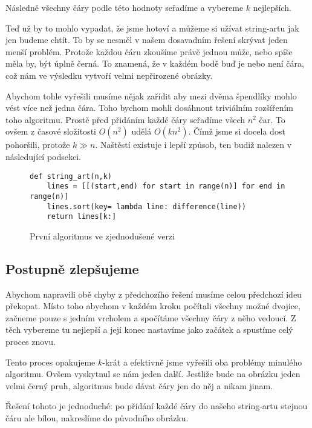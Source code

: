 \documentclass{article}
\begin{document}
Následně všechny čáry podle této hodnoty seřadíme a vybereme $k$ nejlepších.

Teď už by to mohlo vypadat, že jsme hotoví a můžeme si užívat string-artu jak
jen budeme chtít. To by se nesměl v našem dosavadním řešení skrývat jeden menší
problém. Protože každou čáru zkoušíme právě jednou může, nebo spíše měla by, být
úplně černá. To znamená, že v každém bodě buď je nebo není čára, což nám ve
výsledku vytvoří velmi nepřirozené obrázky.

Abychom tohle vyřešili musíme nějak zařídit aby mezi dvěma špendlíky mohlo vést
více než jedna čára. Toho bychom mohli dosáhnout triviálním rozšířením toho
algoritmu. Prostě před přidáním každé čáry seřadíme všech $n^2$ čar. To ovšem z
časové složitosti $O(n^2)$ udělá $O(kn^2)$. Čímž jsme si docela dost pohoršili,
protože $k \gg n$. Naštěstí existuje i lepší způsob, ten budiž nalezen v
následující podsekci.


\begin{figure}[!ht]
 \label{fig:first}
\begin{mdframed}[style=MyFrame]
\begin{lstlisting}[style=metoo]
def string_art(n,k)
    lines = [[(start,end) for start in range(n)] for end in range(n)]
    lines.sort(key= lambda line: difference(line))
    return lines[k:]
 \end{lstlisting}
\end{mdframed}
\caption{První algoritmus ve zjednodušené verzi}
\end{figure}

\subsection{Postupně zlepšujeme}
\label{ssec:postupne-zlepsujeme}

Abychom napravili obě chyby z předchozího řešení musíme celou předchozí ideu
překopat. Místo toho abychom v každém kroku počítali všechny možné dvojice,
začneme pouze s jedním vrcholem a spočítáme všechny čáry z něho vedoucí. Z těch
vybereme tu nejlepší a její konec nastavíme jako začátek a spustíme celý proces
znovu.

Tento proces opakujeme $k$-krát a efektivně jsme vyřešili oba problémy minulého
algoritmu. Ovšem vyskytnul se nám jeden další. Jestliže bude na obrázku jeden
velmi černý pruh, algoritmus bude dávat čáry jen do něj a nikam jinam. 

Řešení tohoto je jednoduché: po přidání každé čáry do našeho string-artu stejnou
čáru ale bílou, nakreslíme do původního obrázku.
\end{document}
